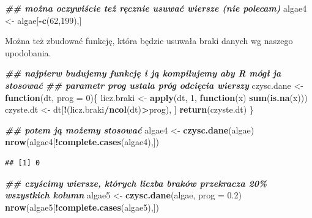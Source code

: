 \documentclass[
]{book}
\newenvironment{Shaded}{\begin{snugshade}}{\end{snugshade}}
\newcommand{\AttributeTok}[1]{\textcolor[rgb]{0.13,0.29,0.53}{#1}}
\newcommand{\ControlFlowTok}[1]{\textcolor[rgb]{0.13,0.29,0.53}{\textbf{#1}}}
\newcommand{\DecValTok}[1]{\textcolor[rgb]{0.00,0.00,0.81}{#1}}
\newcommand{\DocumentationTok}[1]{\textcolor[rgb]{0.56,0.35,0.01}{\textbf{\textit{#1}}}}
\newcommand{\FloatTok}[1]{\textcolor[rgb]{0.00,0.00,0.81}{#1}}
\newcommand{\FunctionTok}[1]{\textcolor[rgb]{0.13,0.29,0.53}{\textbf{#1}}}
\newcommand{\NormalTok}[1]{#1}
\newcommand{\OtherTok}[1]{\textcolor[rgb]{0.56,0.35,0.01}{#1}}
\newcommand{\SpecialCharTok}[1]{\textcolor[rgb]{0.81,0.36,0.00}{\textbf{#1}}}
\theoremstyle{plain}
\theoremstyle{definition}
\theoremstyle{definition}
\theoremstyle{definition}
\theoremstyle{definition}
\theoremstyle{definition}
\theoremstyle{remark}
\begin{document}
\begin{Shaded}
\begin{Highlighting}[]
\DocumentationTok{\#\# można oczywiście też ręcznie usuwać wiersze (nie polecam)}
\NormalTok{algae4 }\OtherTok{\textless{}{-}}\NormalTok{ algae[}\SpecialCharTok{{-}}\FunctionTok{c}\NormalTok{(}\DecValTok{62}\NormalTok{,}\DecValTok{199}\NormalTok{),]}
\end{Highlighting}
\end{Shaded}

Można też zbudować funkcję, która będzie usuwała braki danych wg naszego upodobania.

\begin{Shaded}
\begin{Highlighting}[]
\DocumentationTok{\#\# najpierw budujemy funkcję i ją kompilujemy aby R mógł ja stosować}
\DocumentationTok{\#\# parametr prog ustala próg odcięcia wierszy}
\NormalTok{czysc.dane }\OtherTok{\textless{}{-}} \ControlFlowTok{function}\NormalTok{(dt, }\AttributeTok{prog =} \DecValTok{0}\NormalTok{)\{}
\NormalTok{    licz.braki }\OtherTok{\textless{}{-}} \FunctionTok{apply}\NormalTok{(dt, }\DecValTok{1}\NormalTok{, }\ControlFlowTok{function}\NormalTok{(x) }\FunctionTok{sum}\NormalTok{(}\FunctionTok{is.na}\NormalTok{(x)))}
\NormalTok{    czyste.dt }\OtherTok{\textless{}{-}}\NormalTok{ dt[}\SpecialCharTok{!}\NormalTok{(licz.braki}\SpecialCharTok{/}\FunctionTok{ncol}\NormalTok{(dt)}\SpecialCharTok{\textgreater{}}\NormalTok{prog), ]}
    \FunctionTok{return}\NormalTok{(czyste.dt)}
\NormalTok{\}}
    
\DocumentationTok{\#\# potem ją możemy stosować}
\NormalTok{algae4 }\OtherTok{\textless{}{-}} \FunctionTok{czysc.dane}\NormalTok{(algae)}
\FunctionTok{nrow}\NormalTok{(algae4[}\SpecialCharTok{!}\FunctionTok{complete.cases}\NormalTok{(algae4),])}
\end{Highlighting}
\end{Shaded}

\begin{verbatim}
## [1] 0
\end{verbatim}

\begin{Shaded}
\begin{Highlighting}[]
\DocumentationTok{\#\# czyścimy wiersze, których liczba braków przekracza 20\% wszystkich kolumn}
\NormalTok{algae5 }\OtherTok{\textless{}{-}} \FunctionTok{czysc.dane}\NormalTok{(algae, }\AttributeTok{prog =} \FloatTok{0.2}\NormalTok{)}
\FunctionTok{nrow}\NormalTok{(algae5[}\SpecialCharTok{!}\FunctionTok{complete.cases}\NormalTok{(algae5),])}
\end{Highlighting}
\end{Shaded}
\end{document}
